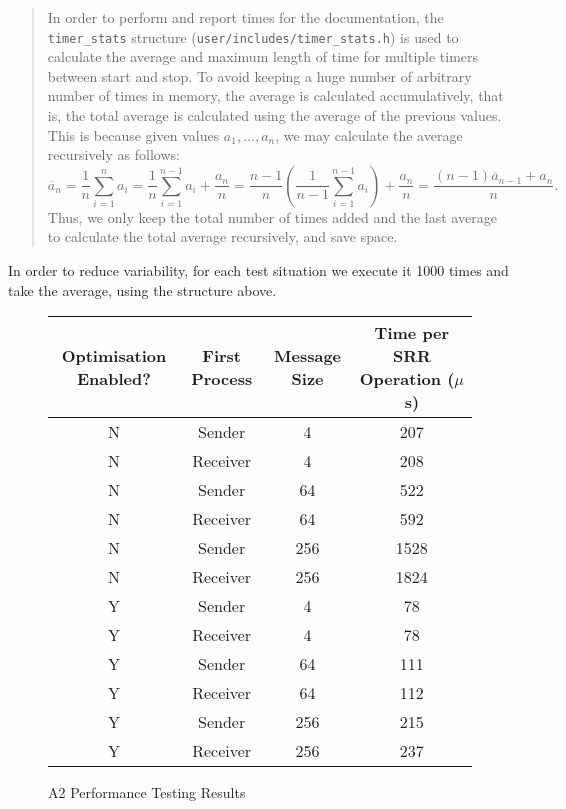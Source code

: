 \documentclass[12pt, titlepage]{article}
\begin{document}
    \begin{quote}
    In order to perform and report times for the documentation, the \verb`timer_stats` structure (\verb`user/includes/timer_stats.h`) is used to calculate the average and maximum length of time for multiple timers between start and stop. To avoid keeping a huge number of arbitrary number of times in memory, the average is calculated accumulatively, that is, the total average is calculated using the average of the previous values. This is because given values $a_1, \ldots, a_n$, we may calculate the average recursively as follows:
    \[
        \overline{a}_n = \frac{1}{n}\sum_{i=1}^n a_i = \frac{1}{n}\sum_{i=1}^{n-1} a_i + \frac{a_n}{n} = \frac{n-1}{n} \left( \frac{1}{n-1} \sum_{i=1}^{n-1} a_i \right) + \frac{a_n}{n} = \frac{(n-1)\overline{a}_{n-1} + a_n}{n}.
    \]
    Thus, we only keep the total number of times added and the last average to calculate the total average recursively, and save space.
    \end{quote}

    In order to reduce variability, for each test situation we execute it 1000 times and take the average, using the structure above.

    \begin{figure}[h]
    \begin{center}
    \begin{tabular}{|c|c|c|c|}
        \hline
        Optimisation Enabled? & First Process & Message Size & Time per SRR Operation ($\mu$s) \\
        \hline
        \hline
        N & Sender & 4 & 207 \\
        N & Receiver & 4 & 208 \\
        N & Sender & 64 & 522 \\
        N & Receiver & 64 & 592 \\
        N & Sender & 256 & 1528 \\
        N & Receiver & 256 & 1824 \\
        Y & Sender & 4 & 78 \\
        Y & Receiver & 4 & 78 \\
        Y & Sender & 64 & 111 \\
        Y & Receiver & 64 & 112 \\
        Y & Sender & 256 & 215 \\
        Y & Receiver & 256 & 237 \\
        \hline
    \end{tabular}
    \end{center}
    \caption{A2 Performance Testing Results}
    \label{fig:perf-tests}
    \end{figure}
\end{document}
